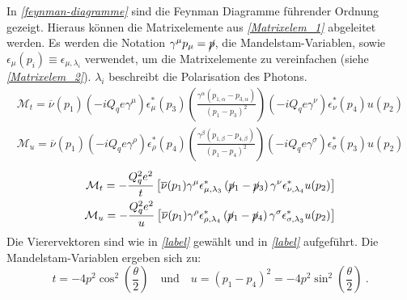 In \textit{\autoref{feynman-diagramme}} sind die Feynman Diagramme führender Ordnung gezeigt. Hieraus können die Matrixelemente aus \textit{\autoref{Matrixelem_1}} abgeleitet werden. Es werden die Notation $\gamma^\mu p_\mu=\cancel{p}$, die Mandelstam-Variablen, sowie $\epsilon_\mu(p_i) \equiv \epsilon_{\mu, \lambda_i}$ verwendet, um die Matrixelemente zu vereinfachen (siehe \textit{\autoref{Matrixelem_2}}). $\lambda_i$ beschreibt die Polarisation des Photons.
\begin{equation}
\begin{aligned}
\mathcal{M}_t = \overline{\nu}\left(p_1\right) \left(-iQ_qe\gamma^\mu\right) \epsilon^*_\mu\left(p_3\right) \left(\frac{\gamma^\alpha \left(p_{1,\alpha} - p_{3, \alpha}\right)}{\left(p_1 - p_3\right)^2}\right) \left(-iQ_qe\gamma^\nu\right) \epsilon^*_\nu\left(p_4\right) u\left( p_2\right) \\
\mathcal{M}_u = \overline{\nu}\left(p_1\right) \left(-iQ_qe\gamma^\rho\right) \epsilon^*_\rho\left(p_4\right) \left(\frac{\gamma^\beta \left(p_{1,\beta} - p_{4, \beta}\right)}{\left(p_1 - p_4\right)^2}\right) \left(-iQ_qe\gamma^\sigma\right) \epsilon^*_\sigma\left(p_3\right) u\left( p_2\right)
\end{aligned}
\label{Matrixelem_1}
\end{equation}
\begin{equation}
\begin{aligned}
\mathcal{M}_t = -\frac{Q_q^2e^2}{t}\left[ \overline{\nu}(p_1) \gamma^\mu \epsilon^*_{\mu, \lambda_3} \left(\cancel{p}_1 - \cancel{p}_3\right) \gamma^\nu \epsilon^*_{\nu, \lambda_4} u(p_2)\right] \\
\mathcal{M}_u = -\frac{Q_q^2e^2}{u}\left[ \overline{\nu}(p_1) \gamma^\rho \epsilon^*_{\rho, \lambda_4} \left(\cancel{p}_1 - \cancel{p}_4\right) \gamma^\sigma \epsilon^*_{\sigma, \lambda_3} u(p_2)\right]
\end{aligned}
\label{Matrixelem_2}
\end{equation}
Die Vierervektoren sind wie in \textit{\autoref{label}} gewählt und in \textit{\autoref{label}} aufgeführt. Die Mandelstam-Variablen ergeben sich zu:
\begin{equation}
t  = -4 p^2 \cos^2\left(\frac{\theta}{2}\right) \quad \text{und} \quad u = (p_1-p_4)^2 = -4p^2 \sin^2\left(\frac{\theta}{2}\right)~.
\end{equation} 
